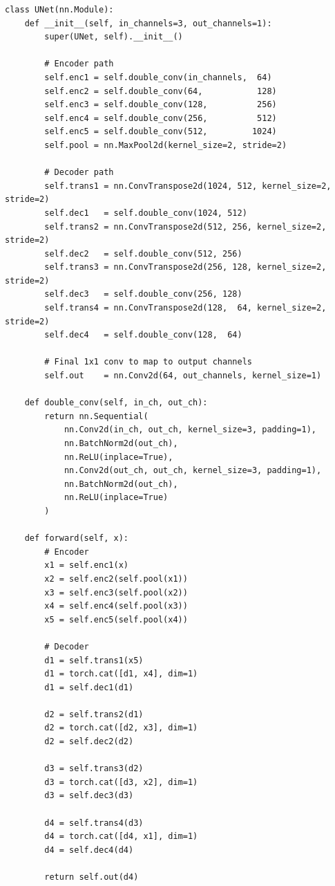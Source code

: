 \documentclass[a4paper, journal]{IEEEtran}
\begin{document}
\begin{lstlisting}[caption={U-Net Architecture}]
class UNet(nn.Module):
    def __init__(self, in_channels=3, out_channels=1):
        super(UNet, self).__init__()
        
        # Encoder path
        self.enc1 = self.double_conv(in_channels,  64)
        self.enc2 = self.double_conv(64,           128)
        self.enc3 = self.double_conv(128,          256)
        self.enc4 = self.double_conv(256,          512)
        self.enc5 = self.double_conv(512,         1024)
        self.pool = nn.MaxPool2d(kernel_size=2, stride=2)
        
        # Decoder path
        self.trans1 = nn.ConvTranspose2d(1024, 512, kernel_size=2, stride=2)
        self.dec1   = self.double_conv(1024, 512)
        self.trans2 = nn.ConvTranspose2d(512, 256, kernel_size=2, stride=2)
        self.dec2   = self.double_conv(512, 256)
        self.trans3 = nn.ConvTranspose2d(256, 128, kernel_size=2, stride=2)
        self.dec3   = self.double_conv(256, 128)
        self.trans4 = nn.ConvTranspose2d(128,  64, kernel_size=2, stride=2)
        self.dec4   = self.double_conv(128,  64)
        
        # Final 1x1 conv to map to output channels
        self.out    = nn.Conv2d(64, out_channels, kernel_size=1)
        
    def double_conv(self, in_ch, out_ch):
        return nn.Sequential(
            nn.Conv2d(in_ch, out_ch, kernel_size=3, padding=1),
            nn.BatchNorm2d(out_ch),
            nn.ReLU(inplace=True),
            nn.Conv2d(out_ch, out_ch, kernel_size=3, padding=1),
            nn.BatchNorm2d(out_ch),
            nn.ReLU(inplace=True)
        )

    def forward(self, x):
        # Encoder
        x1 = self.enc1(x)
        x2 = self.enc2(self.pool(x1))
        x3 = self.enc3(self.pool(x2))
        x4 = self.enc4(self.pool(x3))
        x5 = self.enc5(self.pool(x4))
        
        # Decoder
        d1 = self.trans1(x5)
        d1 = torch.cat([d1, x4], dim=1)
        d1 = self.dec1(d1)
        
        d2 = self.trans2(d1)
        d2 = torch.cat([d2, x3], dim=1)
        d2 = self.dec2(d2)
        
        d3 = self.trans3(d2)
        d3 = torch.cat([d3, x2], dim=1)
        d3 = self.dec3(d3)
        
        d4 = self.trans4(d3)
        d4 = torch.cat([d4, x1], dim=1)
        d4 = self.dec4(d4)
        
        return self.out(d4)
\end{lstlisting}
\end{document}

